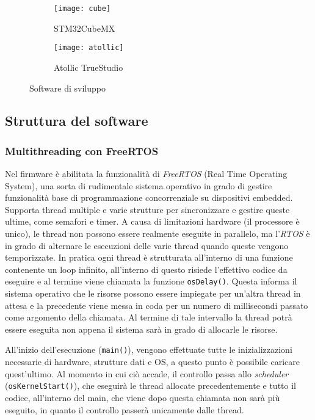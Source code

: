 \begin{figure}
  \center
  \begin{subfigure}{\textwidth}
    \texttt{[image: cube]}
    \caption{STM32CubeMX}
  \end{subfigure}
  \hfill \break
  \newline
  \begin{subfigure}{\textwidth}
    \texttt{[image: atollic]}
    \caption{Atollic TrueStudio}
  \end{subfigure}
  \caption{Software di sviluppo}
  \label{fig:apps}
\end{figure}

\subsection{Struttura del software}

\subsubsection{Multithreading con FreeRTOS}

Nel firmware \`e abilitata la funzionalit\`a di \textit{FreeRTOS} (Real Time Operating System), una sorta di rudimentale sistema operativo in grado di gestire funzionalit\`a base di programmazione concorrenziale su dispositivi embedded. Supporta thread multiple e varie strutture per sincronizzare e gestire queste ultime, come semafori e timer. A causa di limitazioni hardware (il processore \`e unico), le thread non possono essere realmente eseguite in parallelo, ma l'\textit{RTOS} \`e in grado di alternare le esecuzioni delle varie thread quando queste vengono temporizzate. In pratica ogni thread \`e strutturata all'interno di una funzione contenente un loop infinito, all'interno di questo risiede l'effettivo codice da eseguire e al termine viene chiamata la funzione \texttt{osDelay()}. Questa informa il sistema operativo che le risorse possono essere impiegate per un'altra thread in attesa e la precedente viene messa in coda per un numero di millisecondi passato come argomento della chiamata. Al termine di tale intervallo la thread potr\`a essere eseguita non appena il sistema sar\`a in grado di allocarle le risorse.

All'inizio dell'esecuzione (\texttt{main()}), vengono effettuate tutte le inizializzazioni necessarie di hardware, strutture dati e OS, a questo punto \`e possibile caricare quest'ultimo. Al momento in cui ci\`o accade, il controllo passa allo \textit{scheduler} (\texttt{osKernelStart()}), che eseguir\`a le thread allocate precedentemente e tutto il codice, all'interno del main, che viene dopo questa chiamata non sar\`a pi\`u eseguito, in quanto il controllo passer\`a unicamente dalle thread.

